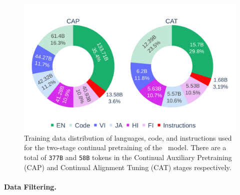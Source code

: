 \begin{figure}[t]
\centering
\includegraphics[width=\columnwidth]{fig/output_file.pdf}
\caption{Training data distribution of languages, code, and instructions used for the two-stage continual pretraining of the \system\ model. There are a total of \texttt{377B} and \texttt{58B} tokens in the Continual Auxiliary Pretraining (CAP) and Continual Alignment Tuning (CAT) stages respectively.} 
\vspace{-3mm}
\label{fig:distribution}
\end{figure}

\paragraph{Data Filtering.}



